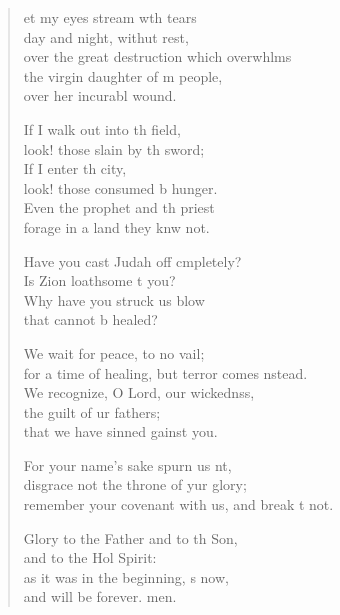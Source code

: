 \begin{verse}
  \begin{patverse}
et my eyes stream w\pointup{\i}th tears\Med\\
day and night, withut rest,\\
over the great destruction which overwhlms\Flex\\
the virgin daughter of m people,\Med\\
over her incurabl wound.

If I walk out into th field,\Med\\
look! those slain by th sword;\\
If I enter th city,\Med\\
look! those consumed b hunger.\\
Even the prophet and th priest\Med\\
forage in a land they knw not.

Have you cast Judah off cmpletely?\Med\\
Is Zion loathsome t you?\\
Why have you struck us  blow\Med\\
that cannot b healed?

We wait for peace, to no vail;\Med\\
for a time of healing, but terror comes \pointup{\i}nstead.\\
We recognize, O Lord, our wickednss,\Flex\\
the guilt of ur fathers;\Med\\
that we have sinned gainst you.

For your name’s sake spurn us nt,\Flex\\
disgrace not the throne of yur glory;\Med\\
remember your covenant with us, and break \pointup{\i}t not.

Glory to the Father and to th Son,\Med\\
and to the Hol Spirit:\\
as it was in the beginning, \pointup{\i}s now,\Med\\
and will be forever. men.
  \end{patverse}
\end{verse}
